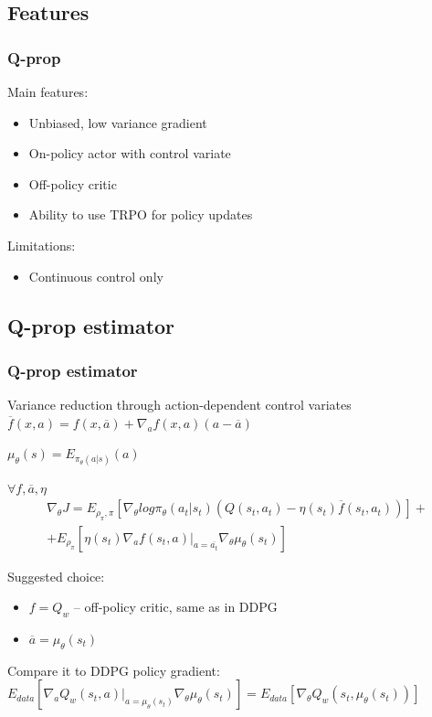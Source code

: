 \documentclass{beamer}
\begin{document}
\subsection{Features}

\begin{frame}[t]
\frametitle{Q-prop}

Main features:
\begin{itemize}
\item Unbiased, low variance gradient
\item On-policy actor with control variate
\item Off-policy critic
\item Ability to use TRPO for policy updates
\end{itemize}

\vspace{4mm}
Limitations:
\begin{itemize}
\item Continuous control only
\end{itemize}

\end{frame}

\subsection{Q-prop estimator}
\begin{frame}[t]
\frametitle{Q-prop estimator}
Variance reduction through action-dependent control variates\\
 
$\overline{f} (x,a) = f(x,\overline{a}) + \nabla_a f(x, a) (a - \overline{a})$

$\mu_\theta(s) = E_{\pi_\theta(a|s)} (a)$

\begin{theorem}
$\forall f, \overline{a}, \eta$
\begin{multline}
\nabla_{\theta} J = E_{\rho_\pi, \pi} \left[ \nabla_{\theta} log \pi_\theta ( a_t | s_t) (Q(s_t, a_t) - \eta(s_t) \overline{f} (s_t,a_t)) \right] + \\ + E_{\rho_\pi} \left[ \eta(s_t) \nabla_a f(s_t, a) |_{a=\overline{a_t}} 
\nabla_\theta \mu_\theta(s_t)
\right]
\end{multline} 
\end{theorem}

Suggested choice: 
\begin{itemize}
\item $f = Q_w$ -- off-policy critic, same as in DDPG
\item $\overline{a} = \mu_\theta(s_t)$
\end{itemize}

Compare it to DDPG policy gradient:
\\$E_{data} \left[ \nabla_a Q_w (s_t, a) |_{a=\mu_\theta(s_t)} 
\nabla_\theta \mu_\theta(s_t) \right] = E_{data} \left[ \nabla_\theta Q_w (s_t, \mu_\theta(s_t)) \right]$

\end{frame}
\end{document}
